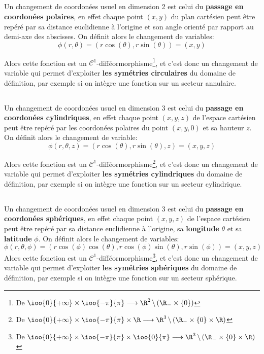 \subsection*{}
Un changement de coordonées usuel en dimension 2 est celui du \textbf{passage en coordonées polaires}, en effet chaque point \( (x, y) \) du plan cartésien peut être repéré par sa distance euclidienne à l'origine et son angle orienté par rapport au demi-axe des abscisses. On définit alors le changement de variables:
\[ 
   \phi(r, \theta) = ( r \cos( \theta),  r \sin( \theta)) = (x, y)
\]

Alors cette fonction est un \( \mathcal{C}^1 \)-difféormorphisme\footnote[1]{De \( \ioo{0}{+ \infty} \times \ioo{-\pi}{\pi} \longrightarrow \R^2 \,\backslash\, (\R_- \times \{0\}) \)}, et c'est donc un changement de variable qui permet d'exploiter \textbf{les symétries circulaires} du domaine de définition, par exemple si on intègre une fonction sur un secteur annulaire.

\subsection*{}
Un changement de coordonées usuel en dimension 3 est celui du \textbf{passage en coordonées cylindriques}, en effet chaque point \( (x, y, z) \) de l'espace cartésien peut être repéré par les coordonées polaires du point \( (x, y, 0) \) et sa hauteur \( z \). On définit alors le changement de variable:
\[ 
   \phi(r, \theta, z) = ( r \cos( \theta),  r \sin( \theta), z) = (x, y, z)
\]

Alors cette fonction est un \( \mathcal{C}^1 \)-difféormorphisme\footnote[2]{De \( \ioo{0}{+ \infty} \times \ioo{-\pi}{\pi} \times \R \longrightarrow \R^3 \,\backslash\, (\R_- \times \{0\} \times \R)\)}, et c'est donc un changement de variable qui permet d'exploiter \textbf{les symétries cylindriques} du domaine de définition, par exemple si on intègre une fonction sur un secteur cylindrique.

\subsection*{}
Un changement de coordonées usuel en dimension 3 est celui du \textbf{passage en coordonées sphériques}, en effet chaque point \( (x, y, z) \) de l'espace cartésien peut être repéré par sa distance euclidienne à l'origine, sa \textbf{longitude} \( \theta \) et sa \textbf{latitude} \( \phi \). On définit alors le changement de variables:
\[ 
   \phi(r, \theta, \phi) = (r \cos( \phi) \cos( \theta), r \cos( \phi) \sin( \theta), r \sin( \phi)) = (x, y, z)
\]
Alors cette fonction est un \( \mathcal{C}^1 \)-difféormorphisme\footnote[3]{De \( \ioo{0}{+ \infty} \times \ioo{-\pi}{\pi} \times \ioo{0}{\pi} \longrightarrow \R^3 \,\backslash\, (\R_- \times \{0\} \times \R) \)}, et c'est donc un changement de variable qui permet d'exploiter \textbf{les symétries sphériques} du domaine de définition, par exemple si on intègre une fonction sur un secteur sphérique.


